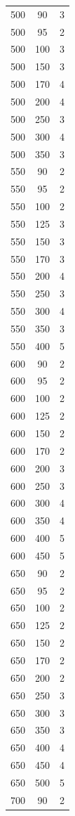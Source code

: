 \begin{longtable}{c c c}
500 & 90 & 3 \\
500 & 95 & 2 \\
500 & 100 & 3 \\
500 & 150 & 3 \\
500 & 170 & 4 \\
500 & 200 & 4 \\
500 & 250 & 3 \\
500 & 300 & 4 \\
500 & 350 & 3 \\
550 & 90 & 2 \\
550 & 95 & 2 \\
550 & 100 & 2 \\
550 & 125 & 3 \\
550 & 150 & 3 \\
550 & 170 & 3 \\
550 & 200 & 4 \\
550 & 250 & 3 \\
550 & 300 & 4 \\
550 & 350 & 3 \\
550 & 400 & 5 \\
600 & 90 & 2 \\
600 & 95 & 2 \\
600 & 100 & 2 \\
600 & 125 & 2 \\
600 & 150 & 2 \\
600 & 170 & 2 \\
600 & 200 & 3 \\
600 & 250 & 3 \\
600 & 300 & 4 \\
600 & 350 & 4 \\
600 & 400 & 5 \\
600 & 450 & 5 \\
650 & 90 & 2 \\
650 & 95 & 2 \\
650 & 100 & 2 \\
650 & 125 & 2 \\
650 & 150 & 2 \\
650 & 170 & 2 \\
650 & 200 & 2 \\
650 & 250 & 3 \\
650 & 300 & 3 \\
650 & 350 & 3 \\
650 & 400 & 4 \\
650 & 450 & 4 \\
650 & 500 & 5 \\
700 & 90 & 2 \\

\end{longtable}
